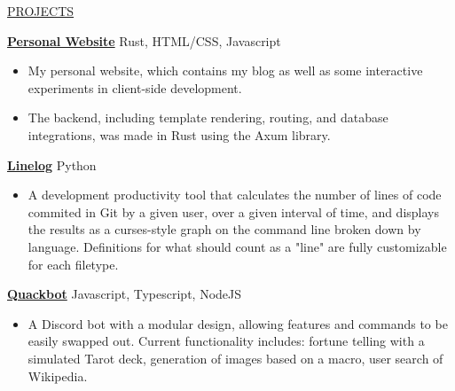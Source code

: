 \documentclass[11pt]{article}
\newcommand{\betteruline}[1]{
    \uline{#1}
}
\newcommand{\sectiontitle}[1]{
    \begingroup
        \titlebold
        \betteruline{\Large\uppercase{#1}  }
        \vspace{1.7mm}
    \endgroup
}
\newcommand{\sectioncontent}[1]{
    \begingroup
        \begin{FlushLeft}
        \vspace{-3mm}
        \sffamily\small#1
        \end{FlushLeft}
    \endgroup
    \vspace{2mm}
}
\newcommand{\project}[2]{
    \begingroup
        \textbf{\small#1}
        \hfill\color{black!70}\small{#2}
    \endgroup
}
\newcommand{\spacevv}{
    \vspace{2mm}
}
\begin{document}
\begin{paracol}{2}
        
    \sectiontitle{projects}
    \sectioncontent{

    
      
        
          \project{ \href{https://implicit.computer}{Personal Website} }{ Rust, HTML/CSS, Javascript  }
        \begin{itemize}

            
              

              \item My personal website, which contains my blog as well as some interactive experiments in client-side development.

                

              \item The backend, including template rendering, routing, and database integrations, was made in Rust using the Axum library.

                
            

        \end{itemize}

        
        \spacevv
        

    
        
          \project{ \href{https://github.com/keagud/linelog}{Linelog} }{ Python  }
        \begin{itemize}

            
              

              \item A development productivity tool that calculates the number of lines of code commited in Git by a given user, over a given interval of time, and displays the results as a curses-style graph on the command line broken down by language. Definitions for what should count as a "line" are fully customizable for each filetype.

                
            

        \end{itemize}

        
        \spacevv
        

    
        
          \project{ \href{https://github.com/keagud/quackbot}{Quackbot} }{ Javascript, Typescript, NodeJS  }
        \begin{itemize}

            
              

              \item A Discord bot with a modular design, allowing features and commands to be easily swapped out. Current functionality includes: fortune telling with a simulated Tarot deck, generation of images based on a macro, user search of Wikipedia.


\end{itemize}}
\end{paracol}
\end{document}

